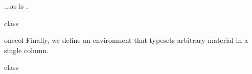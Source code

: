 \documentclass{skdoc}
\begin{document}
	...as is .
\begin{MacroCode}{class}
		\renewenvironment{table}{%
			\begin{gridenv}%
			\vspace{\intextsep}%
			\begin{minipage}{\linewidth}%
			\def\@captype{table}%
			\let\@old@caption\caption%
			\renewcommand{\caption}[1]{%
				\setlength{\@tempdima}{\abovecaptionskip}%
				\setlength{\abovecaptionskip}{\belowcaptionskip}%
				\setlength{\belowcaptionskip}{\@tempdima}%
				\@old@caption{##1}%
				\vspace{\belowcaptionskip}%
			}%
		}{%
			\end{minipage}%
			\vspace{\intextsep}%
			\end{gridenv}%
		}
		\let\oldoldtablest\oldtablest
		\renewcommand{\oldtablest}{%
			\oldoldtablest%
			\let\@old@caption\caption%
			\renewcommand{\caption}[1]{%
				\setlength{\@tempdima}{\abovecaptionskip}%
				\setlength{\abovecaptionskip}{\belowcaptionskip}%
				\setlength{\belowcaptionskip}{\@tempdima}%
				\@old@caption{##1}%
				\vspace{\belowcaptionskip}%
			}%
		}
\end{MacroCode}
	\begin{environment}{onecol}
	Finally, we define an environment  that typesets
	arbitrary material in a single column.
\begin{MacroCode}{class}
		\newenvironment{onecol}{\end{multicols}}{\begin{multicols}{3}}
	}
\end{MacroCode}
	\end{environment}
\begin{MacroCode}{class}
\fi
\end{MacroCode}
\end{document}
